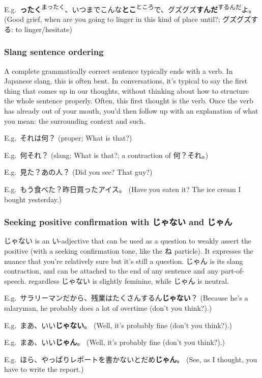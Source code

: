 \documentclass[../nihongo-gakushuu-kyouzai.tex]{subfiles}
\begin{document}
E.g.\ \textbf{ったく}\textsuperscript{まったく}、いつまでこんな\textbf{とこ}\textsuperscript{ところ}で、グズグズ\textbf{すんだ}\textsuperscript{するんだ}よ。 (Good grief, when are you going to linger in this kind of place until?; グズグズする: to linger/hesitate)


\subsubsection{Slang sentence ordering} \label{sec:slang-sentence-ordering}
A complete grammatically correct sentence typically ends with a verb. In Japanese slang, this is often bent. In conversations, it's typical to say the first thing that comes up in our thoughts, without thinking about how to structure the whole sentence properly. Often, this first thought is the verb. Once the verb has already out of your mouth, you'd then follow up with an explanation of what you mean: the surrounding context and such.

E.g.\ それは何？ (proper; What is that?)

E.g.\ 何それ？ (slang; What is that?; a contraction of 何？それ。)

E.g.\ 見た？あの人？ (Did you see? That guy?)

E.g.\ もう食べた？昨日買ったアイス。 (Have you eaten it? The ice cream I bought yesterday.)


\subsubsection{Seeking positive confirmation with じゃない and じゃん} \label{seeking-positive-confirmation-with-janai-jann}
じゃない is an い-adjective that can be used as a question to weakly assert the positive (with a seeking confirmation tone, like the ね particle). It expresses the nuance that you're relatively sure but it's still a question. じゃん is its slang contraction, and can be attached to the end of any sentence and any part-of-speech. regardless  じゃない is slightly feminine, while じゃん is neutral.

E.g.\ サラリーマンだから、残業はたくさんするん\textbf{じゃない}？ (Because he's a salaryman, he probably does a lot of overtime (don't you think?).)

E.g.\ まあ、いい\textbf{じゃない}。 (Well, it's probably fine (don't you think?).)

E.g.\ まあ、いい\textbf{じゃん}。 (Well, it's probably fine (don't you think?).)

E.g.\ ほら、やっぱりレポートを書かないとだめ\textbf{じゃん}。 (See, as I thought, you have to write the report.)
\end{document}
